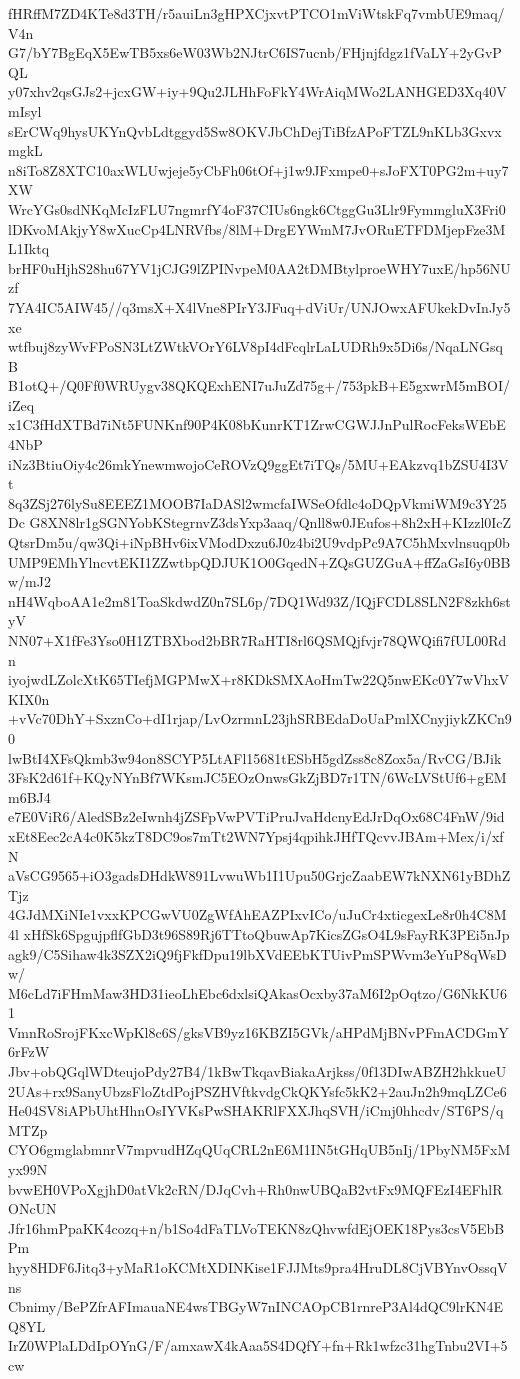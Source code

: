 fHRffM7ZD4KTe8d3TH/r5auiLn3gHPXCjxvtPTCO1mViWtskFq7vmbUE9maq/V4n
G7/bY7BgEqX5EwTB5xs6eW03Wb2NJtrC6IS7ucnb/FHjnjfdgz1fVaLY+2yGvPQL
y07xhv2qsGJs2+jcxGW+iy+9Qu2JLHhFoFkY4WrAiqMWo2LANHGED3Xq40VmIsyl
sErCWq9hysUKYnQvbLdtggyd5Sw8OKVJbChDejTiBfzAPoFTZL9nKLb3GxvxmgkL
n8iTo8Z8XTC10axWLUwjeje5yCbFh06tOf+j1w9JFxmpe0+sJoFXT0PG2m+uy7XW
WrcYGs0sdNKqMcIzFLU7ngmrfY4oF37CIUs6ngk6CtggGu3Llr9FymmgluX3Fri0
lDKvoMAkjyY8wXucCp4LNRVfbs/8lM+DrgEYWmM7JvORuETFDMjepFze3ML1Iktq
brHF0uHjhS28hu67YV1jCJG9lZPINvpeM0AA2tDMBtylproeWHY7uxE/hp56NUzf
7YA4IC5AIW45//q3msX+X4lVne8PIrY3JFuq+dViUr/UNJOwxAFUkekDvInJy5xe
wtfbuj8zyWvFPoSN3LtZWtkVOrY6LV8pI4dFcqlrLaLUDRh9x5Di6s/NqaLNGsqB
B1otQ+/Q0Ff0WRUygv38QKQExhENI7uJuZd75g+/753pkB+E5gxwrM5mBOI/iZeq
x1C3fHdXTBd7iNt5FUNKnf90P4K08bKunrKT1ZrwCGWJJnPulRocFeksWEbE4NbP
iNz3BtiuOiy4c26mkYnewmwojoCeROVzQ9ggEt7iTQs/5MU+EAkzvq1bZSU4I3Vt
8q3ZSj276lySu8EEEZ1MOOB7IaDASl2wmcfaIWSeOfdlc4oDQpVkmiWM9c3Y25Dc
G8XN8lr1gSGNYobKStegrnvZ3dsYxp3aaq/Qnll8w0JEufos+8h2xH+KIzzl0IcZ
QtsrDm5u/qw3Qi+iNpBHv6ixVModDxzu6J0z4bi2U9vdpPc9A7C5hMxvlnsuqp0b
UMP9EMhYlncvtEKI1ZZwtbpQDJUK1O0GqedN+ZQsGUZGuA+ffZaGsI6y0BBw/mJ2
nH4WqboAA1e2m81ToaSkdwdZ0n7SL6p/7DQ1Wd93Z/IQjFCDL8SLN2F8zkh6styV
NN07+X1fFe3Yso0H1ZTBXbod2bBR7RaHTI8rl6QSMQjfvjr78QWQifi7fUL00Rdn
iyojwdLZolcXtK65TIefjMGPMwX+r8KDkSMXAoHmTw22Q5nwEKc0Y7wVhxVKIX0n
+vVc70DhY+SxznCo+dI1rjap/LvOzrmnL23jhSRBEdaDoUaPmlXCnyjiykZKCn90
lwBtI4XFsQkmb3w94on8SCYP5LtAFl15681tESbH5gdZss8c8Zox5a/RvCG/BJik
3FsK2d61f+KQyNYnBf7WKsmJC5EOzOnwsGkZjBD7r1TN/6WcLVStUf6+gEMm6BJ4
e7E0ViR6/AledSBz2eIwnh4jZSFpVwPVTiPruJvaHdcnyEdJrDqOx68C4FnW/9id
xEt8Eec2cA4c0K5kzT8DC9os7mTt2WN7Ypsj4qpihkJHfTQcvvJBAm+Mex/i/xfN
aVsCG9565+iO3gadsDHdkW891LvwuWb1I1Upu50GrjcZaabEW7kNXN61yBDhZTjz
4GJdMXiNIe1vxxKPCGwVU0ZgWfAhEAZPIxvICo/uJuCr4xticgexLe8r0h4C8M4l
xHfSk6SpgujpflfGbD3t96S89Rj6TTtoQbuwAp7KicsZGsO4L9sFayRK3PEi5nJp
agk9/C5Sihaw4k3SZX2iQ9fjFkfDpu19lbXVdEEbKTUivPmSPWvm3eYuP8qWsDw/
M6cLd7iFHmMaw3HD31ieoLhEbc6dxlsiQAkasOcxby37aM6I2pOqtzo/G6NkKU61
VmnRoSrojFKxcWpKl8c6S/gksVB9yz16KBZI5GVk/aHPdMjBNvPFmACDGmY6rFzW
Jbv+obQGqlWDteujoPdy27B4/1kBwTkqavBiakaArjkss/0f13DIwABZH2hkkueU
2UAs+rx9SanyUbzsFloZtdPojPSZHVftkvdgCkQKYsfc5kK2+2auJn2h9mqLZCe6
He04SV8iAPbUhtHhnOsIYVKsPwSHAKRlFXXJhqSVH/iCmj0hhcdv/ST6PS/qMTZp
CYO6gmglabmnrV7mpvudHZqQUqCRL2nE6M1IN5tGHqUB5nIj/1PbyNM5FxMyx99N
bvwEH0VPoXgjhD0atVk2cRN/DJqCvh+Rh0nwUBQaB2vtFx9MQFEzI4EFhlRONcUN
Jfr16hmPpaKK4cozq+n/b1So4dFaTLVoTEKN8zQhvwfdEjOEK18Pys3csV5EbBPm
hyy8HDF6Jitq3+yMaR1oKCMtXDINKise1FJJMts9pra4HruDL8CjVBYnvOssqVns
Cbnimy/BePZfrAFImauaNE4wsTBGyW7nINCAOpCB1rnreP3Al4dQC9lrKN4EQ8YL
IrZ0WPlaLDdIpOYnG/F/amxawX4kAaa5S4DQfY+fn+Rk1wfzc31hgTnbu2VI+5cw
